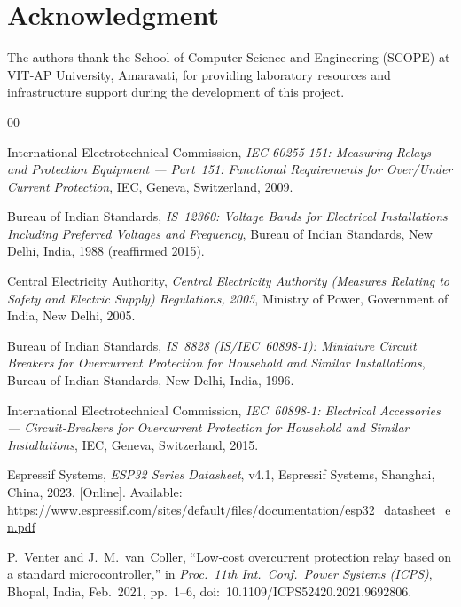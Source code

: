\documentclass[conference]{IEEEtran}
\begin{document}
\section*{Acknowledgment}

The authors thank the School of Computer Science and Engineering
(SCOPE) at VIT-AP University, Amaravati, for providing laboratory
resources and infrastructure support during the development of this
project.

\begin{thebibliography}{00}

International Electrotechnical Commission,
\textit{IEC 60255-151: Measuring Relays and Protection Equipment ---
Part~151: Functional Requirements for Over/Under Current Protection},
IEC, Geneva, Switzerland, 2009.

Bureau of Indian Standards,
\textit{IS~12360: Voltage Bands for Electrical Installations Including
Preferred Voltages and Frequency},
Bureau of Indian Standards, New Delhi, India, 1988 (reaffirmed 2015).

Central Electricity Authority,
\textit{Central Electricity Authority (Measures Relating to Safety and
Electric Supply) Regulations, 2005},
Ministry of Power, Government of India, New Delhi, 2005.

Bureau of Indian Standards,
\textit{IS~8828 (IS/IEC~60898-1): Miniature Circuit Breakers for
Overcurrent Protection for Household and Similar Installations},
Bureau of Indian Standards, New Delhi, India, 1996.

International Electrotechnical Commission,
\textit{IEC~60898-1: Electrical Accessories --- Circuit-Breakers for
Overcurrent Protection for Household and Similar Installations},
IEC, Geneva, Switzerland, 2015.

Espressif Systems,
\textit{ESP32 Series Datasheet}, v4.1,
Espressif Systems, Shanghai, China, 2023. [Online]. Available:
\url{https://www.espressif.com/sites/default/files/documentation/esp32_datasheet_en.pdf}

P.~Venter and J.~M.~van~Coller,
``Low-cost overcurrent protection relay based on a standard
microcontroller,''
in \textit{Proc.\ 11th Int.\ Conf.\ Power Systems (ICPS)},
Bhopal, India, Feb.\ 2021, pp.~1--6,
doi:~10.1109/ICPS52420.2021.9692806.


\end{thebibliography}
\end{document}
